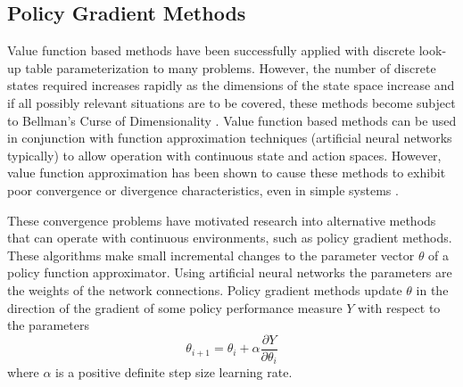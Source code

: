 \subsection{Policy Gradient Methods}
\label{sec:policygradient}
%
Value function based methods have been successfully applied with discrete
look-up table parameterization to many problems.  However, the number of
discrete states required increases rapidly as the dimensions of the state
space increase and if all possibly relevant situations are to be covered, these
methods become subject to Bellman's Curse of Dimensionality
\cite{bellman:1961}.  Value function based methods can be used in conjunction
with function approximation techniques (artificial neural networks typically)
to allow operation with continuous state and action spaces.  However, value
function approximation has been shown to cause these methods to exhibit poor
convergence or divergence characteristics, even in simple systems
\cite{tsitsiklis:94,peters:enac,gordon:95,baird:95}.

These convergence problems have motivated research into alternative
methods that can operate with continuous environments, such as policy
gradient methods.  These algorithms make small incremental changes to the
parameter vector $\theta$ of a policy function approximator.  Using artificial
neural networks the parameters are the weights of the network
connections. Policy gradient methods
update $\theta$ in the direction of the gradient of some policy performance measure $Y$ with respect to the parameters
\begin{equation}
\theta_{i+1} = \theta_i + \alpha \frac{\partial Y}{\partial \theta_i}
\end{equation}
where $\alpha$ is a positive definite step size learning rate.

